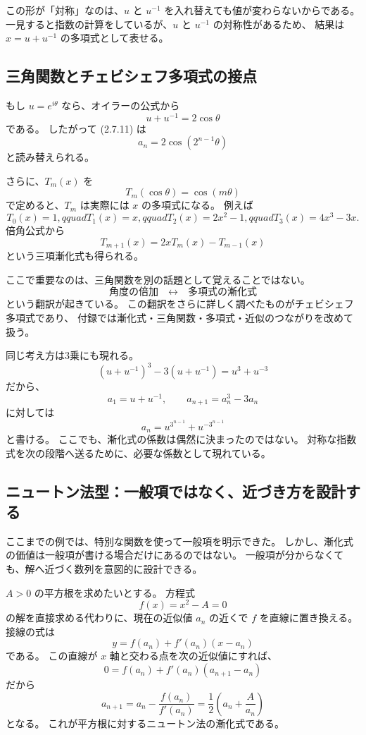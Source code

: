 この形が「対称」なのは、$u$ と $u^{-1}$ を入れ替えても値が変わらないからである。
一見すると指数の計算をしているが、$u$ と $u^{-1}$ の対称性があるため、
結果は $x=u+u^{-1}$ の多項式として表せる。

\subsection{三角関数とチェビシェフ多項式の接点}

もし $u=e^{i\theta}$ なら、オイラーの公式から
\[
  u+u^{-1}=2\cos\theta
\]
である。
したがって (2.7.11) は
\[
  a_n=2\cos(2^{n-1}\theta)
\]
と読み替えられる。

さらに、$T_m(x)$ を
\[
  T_m(\cos\theta)=\cos(m\theta)
  \tag{2.7.12}
\]
で定めると、$T_m$ は実際には $x$ の多項式になる。
例えば
\[
  T_0(x)=1,qquad T_1(x)=x,qquad T_2(x)=2x^2-1,qquad
  T_3(x)=4x^3-3x .
\]
倍角公式から
\[
  T_{m+1}(x)=2xT_m(x)-T_{m-1}(x)
  \tag{2.7.13}
\]
という三項漸化式も得られる。

ここで重要なのは、三角関数を別の話題として覚えることではない。
\[
  \text{角度の倍加}
  \quad\longleftrightarrow\quad
  \text{多項式の漸化式}
\]
という翻訳が起きている。
この翻訳をさらに詳しく調べたものがチェビシェフ多項式であり、
付録では漸化式・三角関数・多項式・近似のつながりを改めて扱う。

同じ考え方は3乗にも現れる。
\[
  (u+u^{-1})^3-3(u+u^{-1})=u^3+u^{-3}
\]
だから、
\[
  a_1=u+u^{-1},
  \qquad
  a_{n+1}=a_n^3-3a_n
\]
に対しては
\[
  a_n=u^{3^{n-1}}+u^{-3^{n-1}}
\]
と書ける。
ここでも、漸化式の係数は偶然に決まったのではない。
対称な指数式を次の段階へ送るために、必要な係数として現れている。

\subsection{ニュートン法型：一般項ではなく、近づき方を設計する}

ここまでの例では、特別な関数を使って一般項を明示できた。
しかし、漸化式の価値は一般項が書ける場合だけにあるのではない。
一般項が分からなくても、解へ近づく数列を意図的に設計できる。

$A>0$ の平方根を求めたいとする。
方程式
\[
  f(x)=x^2-A=0
\]
の解を直接求める代わりに、現在の近似値 $a_n$ の近くで $f$ を直線に置き換える。
接線の式は
\[
  y=f(a_n)+f'(a_n)(x-a_n)
\]
である。
この直線が $x$ 軸と交わる点を次の近似値にすれば、
\[
  0=f(a_n)+f'(a_n)(a_{n+1}-a_n)
\]
だから
\[
  a_{n+1}
    =a_n-\frac{f(a_n)}{f'(a_n)}
    =\frac12\left(a_n+\frac{A}{a_n}\right)
  \tag{2.7.14}
\]
となる。
これが平方根に対するニュートン法の漸化式である。

